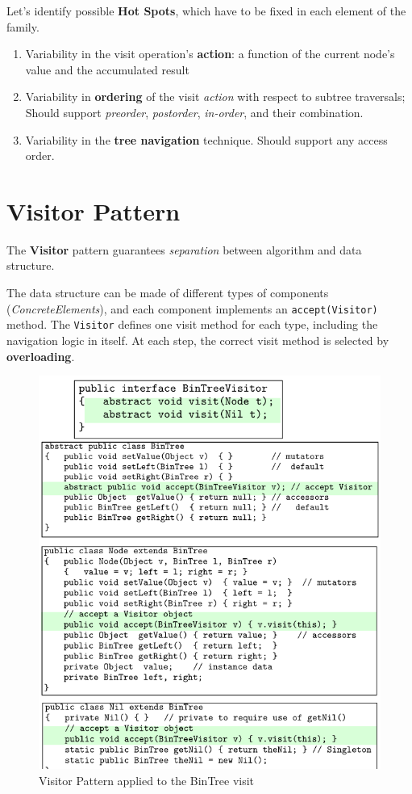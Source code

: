 Let's identify possible \textbf{Hot Spots}, which have to be fixed in each element of the family.
\begin{enumerate}
   \item Variability in the visit operation’s \textbf{action}:
   a function of the current node’s value and the accumulated result
   \item Variability in \textbf{ordering} of the visit \textit{action} with respect to subtree traversals;
   Should support \textit{preorder},
   \textit{postorder}, \textit{in-order}, and their combination.
   \item Variability in the \textbf{tree navigation} technique. 
   Should support any access order.
\end{enumerate}

\newpage
\section{Visitor Pattern}
\begin{paracol}{2}
   \colfill
   The \textbf{Visitor} pattern guarantees \textit{separation} between algorithm
   and data structure.
   \nl

   The data structure can be made of different types of components (\textit{ConcreteElements}), and each component implements an
   \lstinline|accept(Visitor)| method.
   The \lstinline|Visitor| defines one visit method
   for each type, including the navigation logic in itself.
   At each step, the correct visit method
   is selected by \textbf{overloading}.
   \colfill
   \switchcolumn

   \begin{figure}[htbp]
      \centering
      \includegraphics[width=0.9\columnwidth]{images/visitorpattern_treecode.png}
      \caption{Visitor Pattern applied to the BinTree visit}
      \label{fig:visitorpattern_treecode}
   \end{figure}
\end{paracol}

